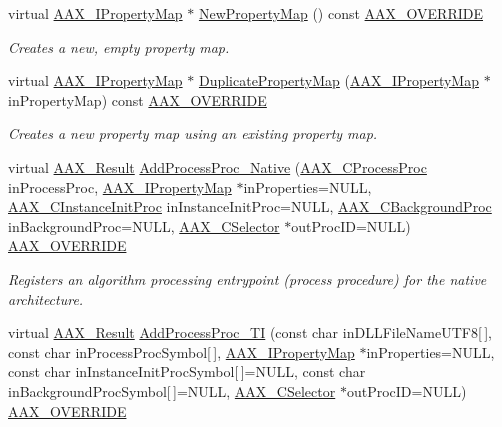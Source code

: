 \begin{DoxyCompactItemize}
virtual \hyperlink{a00112}{A\+A\+X\+\_\+\+I\+Property\+Map} $\ast$ \hyperlink{a00131_aab03e55f1e611c917cec2a9cc9a7a121}{New\+Property\+Map} () const \hyperlink{a00149_ac2f24a5172689ae684344abdcce55463}{A\+A\+X\+\_\+\+O\+V\+E\+R\+R\+I\+D\+E}
\begin{DoxyCompactList}\small\item\em Creates a new, empty property map. \end{DoxyCompactList}\item 
virtual \hyperlink{a00112}{A\+A\+X\+\_\+\+I\+Property\+Map} $\ast$ \hyperlink{a00131_aed25c544191e62b1978aefa4e4dd913d}{Duplicate\+Property\+Map} (\hyperlink{a00112}{A\+A\+X\+\_\+\+I\+Property\+Map} $\ast$in\+Property\+Map) const \hyperlink{a00149_ac2f24a5172689ae684344abdcce55463}{A\+A\+X\+\_\+\+O\+V\+E\+R\+R\+I\+D\+E}
\begin{DoxyCompactList}\small\item\em Creates a new property map using an existing property map. \end{DoxyCompactList}\item 
virtual \hyperlink{a00149_a4d8f69a697df7f70c3a8e9b8ee130d2f}{A\+A\+X\+\_\+\+Result} \hyperlink{a00131_a21e758a4ad757e694c183548fe58f0f0}{Add\+Process\+Proc\+\_\+\+Native} (\hyperlink{a00163_ad6dd5e1aa5bd2f8462966685e3b26a6e}{A\+A\+X\+\_\+\+C\+Process\+Proc} in\+Process\+Proc, \hyperlink{a00112}{A\+A\+X\+\_\+\+I\+Property\+Map} $\ast$in\+Properties=N\+U\+L\+L, \hyperlink{a00163_a3963a850079d3186e08c97a1a4d0ef1c}{A\+A\+X\+\_\+\+C\+Instance\+Init\+Proc} in\+Instance\+Init\+Proc=N\+U\+L\+L, \hyperlink{a00163_aa64561d963284a3124a0821e7dc79c9a}{A\+A\+X\+\_\+\+C\+Background\+Proc} in\+Background\+Proc=N\+U\+L\+L, \hyperlink{a00149_aeaf9b387f902c50a8360ff423f4a1f23}{A\+A\+X\+\_\+\+C\+Selector} $\ast$out\+Proc\+I\+D=N\+U\+L\+L) \hyperlink{a00149_ac2f24a5172689ae684344abdcce55463}{A\+A\+X\+\_\+\+O\+V\+E\+R\+R\+I\+D\+E}
\begin{DoxyCompactList}\small\item\em Registers an algorithm processing entrypoint (process procedure) for the native architecture. \end{DoxyCompactList}\item 
virtual \hyperlink{a00149_a4d8f69a697df7f70c3a8e9b8ee130d2f}{A\+A\+X\+\_\+\+Result} \hyperlink{a00131_abd3f08cdbc3c6585c32b4a5b58043dde}{Add\+Process\+Proc\+\_\+\+T\+I} (const char in\+D\+L\+L\+File\+Name\+U\+T\+F8\mbox{[}$\,$\mbox{]}, const char in\+Process\+Proc\+Symbol\mbox{[}$\,$\mbox{]}, \hyperlink{a00112}{A\+A\+X\+\_\+\+I\+Property\+Map} $\ast$in\+Properties=N\+U\+L\+L, const char in\+Instance\+Init\+Proc\+Symbol\mbox{[}$\,$\mbox{]}=N\+U\+L\+L, const char in\+Background\+Proc\+Symbol\mbox{[}$\,$\mbox{]}=N\+U\+L\+L, \hyperlink{a00149_aeaf9b387f902c50a8360ff423f4a1f23}{A\+A\+X\+\_\+\+C\+Selector} $\ast$out\+Proc\+I\+D=N\+U\+L\+L) \hyperlink{a00149_ac2f24a5172689ae684344abdcce55463}{A\+A\+X\+\_\+\+O\+V\+E\+R\+R\+I\+D\+E}

\end{DoxyCompactItemize}
